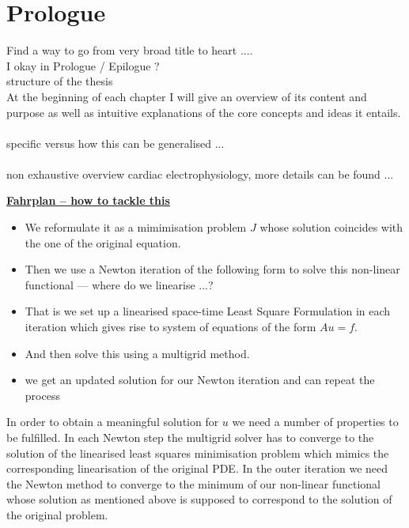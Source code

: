 \documentclass[../draft_1.tex]{subfiles}
\begin{document}
\chapter{Prologue}
Find a way to go from very broad title to heart ....
\bigskip
\\
I okay in Prologue / Epilogue ? 
\bigskip
\\
structure of the thesis \\
At the beginning of each chapter I will give an overview of its content and purpose as well as intuitive explanations of the core concepts and ideas it entails. \\
\\
specific versus how this can be generalised ...  \\
\\ 
non exhaustive overview cardiac electrophysiology, more details can be found ...
\smallskip
\\

\begin{framed}
	\underline{\textbf{Fahrplan -- how to tackle this}} 
	
	\begin{itemize}
		\item  We reformulate it as a mimimisation problem $J$ whose solution coincides with the one of the original equation. 
		\item Then we use a Newton iteration of the following form to solve this non-linear functional --- where do we linearise ...?
		\item  That is we set up a linearised space-time Least Square Formulation in each iteration which gives rise to system of equations of the form $Au = f$.
		\item  And then solve this using a multigrid method. 
		\item we get an updated solution for our Newton iteration and can repeat the process
	\end{itemize}	
\end{framed}


In order to obtain a meaningful solution for $u$ we need a number of properties to be fulfilled. In each Newton step the multigrid solver has to converge to the solution of the linearised least squares minimisation problem which mimics the corresponding linearisation of the original PDE. In the outer iteration we need the Newton method to converge to the minimum of our non-linear functional whose solution as mentioned above is supposed to correspond to the solution of the original problem.
\end{document}
